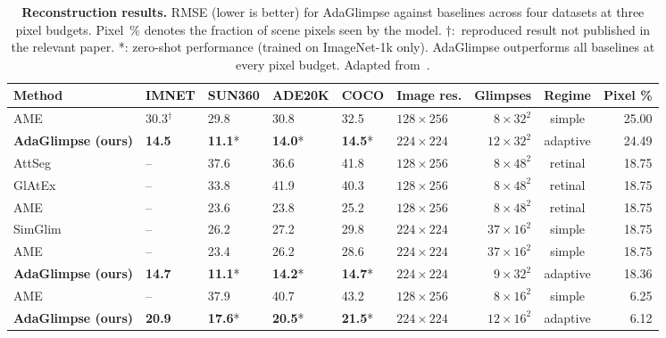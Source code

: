 \begin{table}[th]
    \caption[Reconstruction results across datasets and pixel budgets]{\textbf{Reconstruction results.} RMSE (lower is better) for AdaGlimpse against baselines across four datasets at three pixel budgets. Pixel~\% denotes the fraction of scene pixels seen by the model. $\dag$:~reproduced result not published in the relevant paper. *: zero-shot performance (trained on ImageNet-1k only). AdaGlimpse outperforms all baselines at every pixel budget. Adapted from~.}
    \label{tab:adaglimpse-reconstruction}
    \begin{center}
    \begin{small}
    \setlength{\tabcolsep}{5.5pt}
    \begin{tabular}{l@{\hskip6pt}lllllr@{\hskip8pt}cr}
    \toprule
    Method & IMNET & SUN360 & ADE20K & COCO & Image res. & Glimpses & Regime & Pixel \% \\
    \midrule
    AME & 30.3$^\dag$ & 29.8 & 30.8 & 32.5 & $128 \times 256$ & $8 \times 32^2$ & simple & 25.00 \\
    \textbf{AdaGlimpse (ours)} & \textbf{14.5} & \textbf{11.1}* & \textbf{14.0}* & \textbf{14.5}* & $224 \times 224$ & $12 \times 32^2$ & adaptive & 24.49 \\
    \midrule
    AttSeg & -- & 37.6 & 36.6 & 41.8 & $128 \times 256$ & $8 \times 48^2$ & retinal & 18.75 \\
    GlAtEx & -- & 33.8 & 41.9 & 40.3 & $128 \times 256$ & $8 \times 48^2$ & retinal & 18.75 \\
    AME & -- & 23.6 & 23.8 & 25.2 & $128 \times 256$ & $8 \times 48^2$ & retinal & 18.75 \\
    SimGlim & -- & 26.2 & 27.2 & 29.8 & $224 \times 224$ & $37 \times 16^2$ & simple & 18.75 \\
    AME & -- & 23.4 & 26.2 & 28.6 & $224 \times 224$ & $37 \times 16^2$ & simple & 18.75 \\
    \textbf{AdaGlimpse (ours)} & \textbf{14.7} & \textbf{11.1}* & \textbf{14.2}* & \textbf{14.7}* & $224 \times 224$ & $9 \times 32^2$ & adaptive & 18.36 \\
    \midrule
    AME & -- & 37.9 & 40.7 & 43.2 & $128 \times 256$ & $8 \times 16^2$ & simple & 6.25 \\
    \textbf{AdaGlimpse (ours)} & \textbf{20.9} & \textbf{17.6}* & \textbf{20.5}* & \textbf{21.5}* & $224 \times 224$ & $12 \times 16^2$ & adaptive & 6.12 \\
    \bottomrule
    \end{tabular}
    \end{small}
    \end{center}
\end{table}

